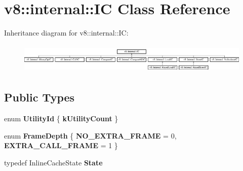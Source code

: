 \hypertarget{classv8_1_1internal_1_1_i_c}{}\section{v8\+:\+:internal\+:\+:I\+C Class Reference}
\label{classv8_1_1internal_1_1_i_c}
Inheritance diagram for v8\+:\+:internal\+:\+:I\+C\+:\begin{figure}[H]
\begin{center}
\leavevmode
\includegraphics[height=1.445783cm]{classv8_1_1internal_1_1_i_c}
\end{center}
\end{figure}
\subsection*{Public Types}
\begin{DoxyCompactItemize}
\item 
\hypertarget{classv8_1_1internal_1_1_i_c_a3326f16adfe1ee39f892a6646ff7eb62}{}enum {\bfseries Utility\+Id} \{ {\bfseries k\+Utility\+Count}
 \}\label{classv8_1_1internal_1_1_i_c_a3326f16adfe1ee39f892a6646ff7eb62}

\item 
\hypertarget{classv8_1_1internal_1_1_i_c_aca6faa5726bfdbe4606466cc5ca2e0f7}{}enum {\bfseries Frame\+Depth} \{ {\bfseries N\+O\+\_\+\+E\+X\+T\+R\+A\+\_\+\+F\+R\+A\+M\+E} = 0, 
{\bfseries E\+X\+T\+R\+A\+\_\+\+C\+A\+L\+L\+\_\+\+F\+R\+A\+M\+E} = 1
 \}\label{classv8_1_1internal_1_1_i_c_aca6faa5726bfdbe4606466cc5ca2e0f7}

\item 
\hypertarget{classv8_1_1internal_1_1_i_c_ad746d8b0ce82eec3a86b4744ca50798a}{}typedef Inline\+Cache\+State {\bfseries State}\label{classv8_1_1internal_1_1_i_c_ad746d8b0ce82eec3a86b4744ca50798a}

\end{DoxyCompactItemize}
